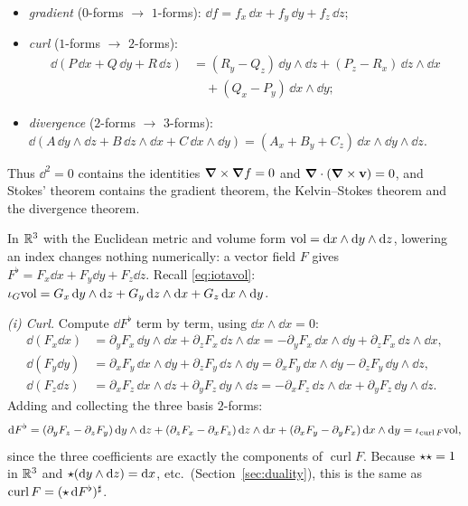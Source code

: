 \begin{example}
\begin{itemize}
  \item \emph{gradient} ($0$-forms $\to$ $1$-forms):
  $\dd f=f_x\,\dd x+f_y\,\dd y+f_z\,\dd z$;
  \item \emph{curl} ($1$-forms $\to$ $2$-forms):
  \begin{align*}
   \dd(P\,\dd x+Q\,\dd y+R\,\dd z)&=(R_y-Q_z)\,\dd y\wedge\dd z+(P_z-R_x)\,\dd z\wedge\dd x\\
   &\quad+(Q_x-P_y)\,\dd x\wedge\dd y;
  \end{align*}
  \item \emph{divergence} ($2$-forms $\to$ $3$-forms):
  $\dd(A\,\dd y\wedge\dd z+B\,\dd z\wedge\dd x+C\,\dd x\wedge\dd y)=(A_x+B_y+C_z)\,\dd x\wedge\dd y\wedge\dd z$.
\end{itemize}

Thus $\dd^2=0$ contains the identities $\boldsymbol{\nabla}\times\boldsymbol{\nabla} f=0$ and $\boldsymbol{\nabla}\cdot(\boldsymbol{\nabla}\times\mathbf v)=0$, and Stokes' theorem contains the gradient theorem, the Kelvin--Stokes theorem and the divergence theorem.
\end{example}

In $\mathbb{R}^3$ with the Euclidean metric and volume form $\mathrm{vol}=\mathrm{d} x\wedge\mathrm{d} y\wedge\mathrm{d} z$, lowering an index changes nothing numerically: a vector field $F$ gives $F^\flat=F_x\dd x+F_y\dd y+F_z\dd z$. Recall \eqref{eq:iotavol}: $\iota_G\mathrm{vol}=G_x\,\mathrm{d} y\wedge\mathrm{d} z+G_y\,\mathrm{d} z\wedge\mathrm{d} x+G_z\,\mathrm{d} x\wedge\mathrm{d} y$.

\emph{(i) Curl.} Compute $\dd F^\flat$ term by term, using $\dd x\wedge\dd x=0$:
\begin{align*}
\dd(F_x\dd x)&=\partial_yF_x\,\dd y\wedge\dd x+\partial_zF_x\,\dd z\wedge\dd x=-\partial_yF_x\,\dd x\wedge\dd y+\partial_zF_x\,\dd z\wedge\dd x,\\
\dd(F_y\dd y)&=\partial_xF_y\,\dd x\wedge\dd y+\partial_zF_y\,\dd z\wedge\dd y=\partial_xF_y\,\dd x\wedge\dd y-\partial_zF_y\,\dd y\wedge\dd z,\\
\dd(F_z\dd z)&=\partial_xF_z\,\dd x\wedge\dd z+\partial_yF_z\,\dd y\wedge\dd z=-\partial_xF_z\,\dd z\wedge\dd x+\partial_yF_z\,\dd y\wedge\dd z.
\end{align*}
Adding and collecting the three basis $2$-forms:
\[
\mathrm{d} F^\flat=(\partial_yF_z-\partial_zF_y)\,\mathrm{d} y\wedge\mathrm{d} z+(\partial_zF_x-\partial_xF_z)\,\mathrm{d} z\wedge\mathrm{d} x+(\partial_xF_y-\partial_yF_x)\,\mathrm{d} x\wedge\mathrm{d} y=\iota_{\operatorname{curl}F}\mathrm{vol},
\]
since the three coefficients are exactly the components of $\operatorname{curl}F$. Because $\star\star=1$ in $\mathbb{R}^3$ and $\star(\mathrm{d} y\wedge\mathrm{d} z)=\mathrm{d} x$, etc.\ (Section~\ref{sec:duality}), this is the same as $\operatorname{curl}F=(\star\,\mathrm{d} F^\flat)^\sharp$.

